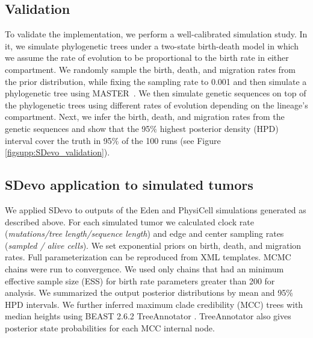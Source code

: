 \documentclass[12pt]{elife_based}
\begin{document}
\subsection*{Validation}
To validate the implementation, we perform a well-calibrated simulation study.
In it, we simulate phylogenetic trees under a two-state birth-death model in which we assume the rate of evolution to be proportional to the birth rate in either compartment.
We randomly sample the birth, death, and migration rates from the prior distribution, while fixing the sampling rate to 0.001 and then simulate a phylogenetic tree using MASTER~\citep{vaughan2013stochastic}.
We then simulate genetic sequences on top of the phylogenetic trees using different rates of evolution depending on the lineage's compartment.
Next, we infer the birth, death, and migration rates from the genetic sequences and show that the 95$\%$ highest posterior density (HPD) interval cover the truth in 95$\%$ of the 100 runs (see Figure \ref{figsupp:SDevo_validation}).

\subsection*{SDevo application to simulated tumors}
We applied SDevo to outputs of the Eden and PhysiCell simulations generated as described above. For each simulated tumor we calculated clock rate (\textit{mutations/tree length/sequence length}) and edge and center sampling rates (\textit{sampled / alive cells}). We set exponential priors on birth, death, and migration rates. Full parameterization can be reproduced from XML templates. MCMC chains were run to convergence. We used only chains that had an minimum effective sample size (ESS) for birth rate parameters greater than 200 for analysis. We summarized the output posterior distributions by mean and 95\% HPD intervals. We further inferred maximum clade credibility (MCC) trees with median heights using BEAST 2.6.2 TreeAnnotator \citep{BouckaertBeast2}. TreeAnnotator also gives posterior state probabilities for each MCC internal node.  
\end{document}
